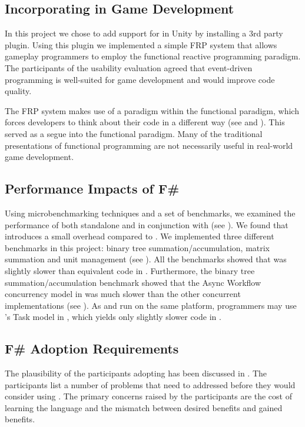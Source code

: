 \subsection{Incorporating \fs in Game Development}
In this project we chose to add support for \fs in Unity by installing a 3rd party plugin. Using this plugin we implemented a simple \gls{FRP} system that allows gameplay programmers to employ the functional reactive programming paradigm. The participants of the usability evaluation agreed that event-driven programming is well-suited for game development and would improve code quality.

The \gls{FRP} system makes use of a paradigm within the functional paradigm, which forces developers to think about their code in a different way (see  and ). This served as a segue into the functional paradigm. Many of the traditional presentations of functional programming are not necessarily useful in real-world game development.

\subsection{Performance Impacts of F\#}
Using microbenchmarking techniques and a set of benchmarks, we examined the performance of \fs both standalone and in conjunction with \unity (see ). We found that \fs introduces a small overhead compared to \cs. %
We implemented three different benchmarks in this project: binary tree summation/accumulation, matrix summation and unit management (see ). All the benchmarks showed that \fs was slightly slower than equivalent code in \cs. Furthermore, the binary tree summation/accumulation benchmark showed that the Async Workflow concurrency model in \fs was much slower than the other concurrent implementations (see ). As \cs and \fs run on the same platform, programmers may use \cs's Task model in \fs, which yields only slightly slower code in \fs.

\subsection{F\# Adoption Requirements}
The plausibility of the participants adopting \fs has been discussed in . The participants list a number of problems that need to addressed before they would consider using \fs. The primary concerns raised by the participants are the cost of learning the language and the mismatch between desired benefits and gained benefits.

